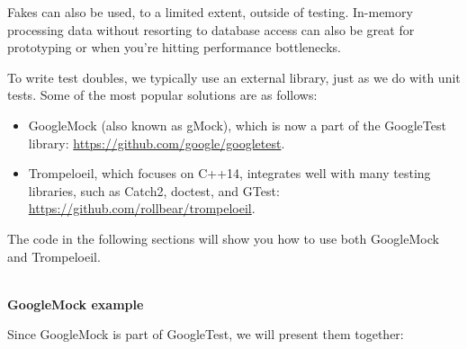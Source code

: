 
Fakes can also be used, to a limited extent, outside of testing. In-memory processing data without resorting to database access can also be great for prototyping or when you're hitting performance bottlenecks.


To write test doubles, we typically use an external library, just as we do with unit tests. Some of the most popular solutions are as follows:

\begin{itemize}
\item 
GoogleMock (also known as gMock), which is now a part of the GoogleTest library: \url{https://github.com/google/googletest}.

\item 
Trompeloeil, which focuses on C++14, integrates well with many testing libraries, such as Catch2, doctest, and GTest: \url{https://github.com/rollbear/trompeloeil}.
\end{itemize}

The code in the following sections will show you how to use both GoogleMock and Trompeloeil.

\hspace*{\fill} \\ %
\noindent
\textbf{GoogleMock example}

Since GoogleMock is part of GoogleTest, we will present them together:

